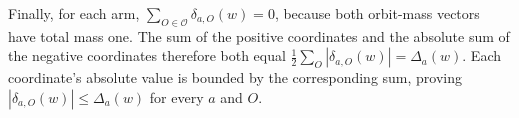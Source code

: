 Finally, for each arm, \(\sum_{O\in\mathcal O}\delta_{a,O}(w)=0\), because both orbit-mass vectors have total mass one. The sum of the positive coordinates and the absolute sum of the negative coordinates therefore both equal \(\frac12\sum_O|\delta_{a,O}(w)|=\Delta_a(w)\). Each coordinate's absolute value is bounded by the corresponding sum, proving \(|\delta_{a,O}(w)|\le\Delta_a(w)\) for every \(a\) and \(O\).